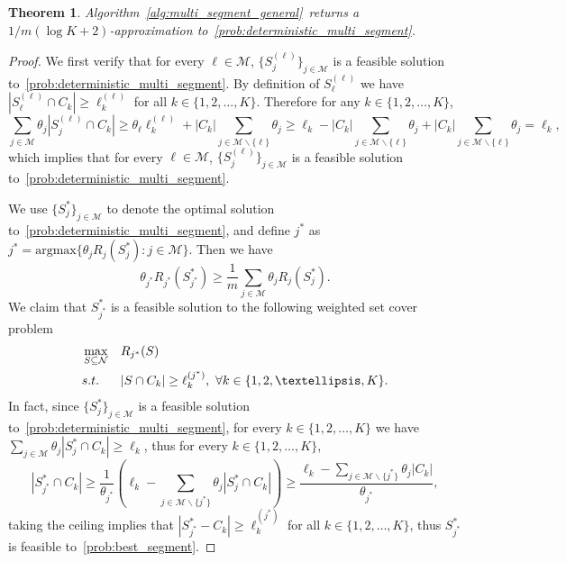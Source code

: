 \documentclass[msom,non-blindrev]{informs3} %
\newtheorem{theorem}{Theorem}
\theoremstyle{definition}
\begin{document}
\begin{theorem} \label{thm:algo-multi-segement-general-m}
Algorithm~\ref{alg:multi_segment_general}~returns a $1/m(\log K+2)$-approximation to~\eqref{prob:deterministic_multi_segment}.
\end{theorem}

\begin{proof}
We first verify that for every $\ell\in\mathcal{M}$, $\{S_j^{(\ell)}\}_{j\in\mathcal{M}}$ is a feasible solution to~\eqref{prob:deterministic_multi_segment}. By definition of $S_\ell^{(\ell)}$ we have $|S_{\ell}^{(\ell)}\cap C_k|\geq \ell_k^{(\ell)}$ for all $k\in\{1,2,\dots,K\}$. Therefore for any $k\in\{1,2,\dots,K\}$,
\begin{equation*}
\sum_{j\in\mathcal{M}}\theta_j|S_j^{(\ell)}\cap C_k|\geq \theta_\ell\ell_k^{(\ell)}+|C_k|\sum_{j\in\mathcal{M}\backslash\{\ell\}} \theta_j\geq \ell_k-|C_k|\sum_{j\in\mathcal{M}\backslash\{\ell\}}\theta_j+|C_k|\sum_{j\in\mathcal{M}\backslash\{\ell\}}\theta_j=\ell_k,
\end{equation*}
which implies that for every $\ell\in\mathcal{M}$, $\{S_j^{(\ell)}\}_{j\in\mathcal{M}}$ is a feasible solution to~\eqref{prob:deterministic_multi_segment}.

We use $\{S_j^*\}_{j\in\mathcal{M}}$ to denote the optimal solution to~\eqref{prob:deterministic_multi_segment}, and define $j^*$ as \mbox{$j^*=\mathrm{argmax}\{\theta_jR_j(S_j^*):j\in\mathcal{M}\}$}. Then we have
\begin{equation*}
\theta_{j^*}R_{j^*}(S_{j^*}^*)\geq \dfrac{1}{m}\sum_{j\in\mathcal{M}}\theta_jR_j(S_j^*).
\end{equation*}
We claim that $S_{j^*}^*$ is a feasible solution to the following weighted set cover problem
\begin{equation}
\begin{aligned}
&\max_{S\subseteq\mathcal{N}}&&R_{j^*}(S)\\
&\textup{s.t.}&&{|S\cap C_k|\geq \ell_k^{(j^*)},\ \forall k\in\{1,2,\dots,K\}.}
\end{aligned}\label{prob:best_segment}
\end{equation}
In fact, since $\{S_j^*\}_{j\in\mathcal{M}}$ is a feasible solution to~\eqref{prob:deterministic_multi_segment}, for every $k\in\{1,2,\dots,K\}$ we have \mbox{$\sum_{j\in\mathcal{M}}\theta_j|S_j^*\cap C_k|\geq \ell_k$}, thus for every $k\in\{1,2,\dots,K\}$,
\begin{equation*}
|S_{j^*}^*\cap C_k|\geq \dfrac{1}{\theta_{j^*}}\left(\ell_k-\sum_{j\in\mathcal{M}\backslash\{j^*\}}\theta_j|S_j^*\cap C_k|\right)\geq \dfrac{\ell_k-\sum_{j\in\mathcal{M}\backslash\{j^*\}}\theta_j|C_k|}{\theta_{j^*}},
\end{equation*}
taking the ceiling implies that $|S_{j^*}^*-C_k|\geq \ell_k^{(j^*)}$ for all $k\in\{1,2,\dots,K\}$, thus $S_{j^*}^*$ is feasible to~\eqref{prob:best_segment}.


\end{proof}
\end{document}
